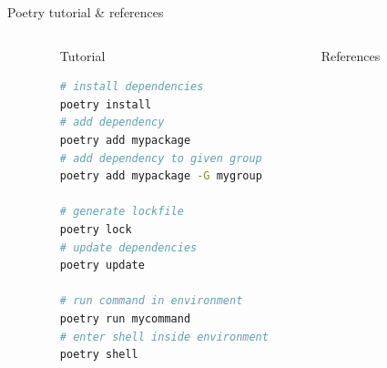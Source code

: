 \documentclass[9pt]{beamer}
\begin{document}
\begin{frame}[fragile]{Poetry tutorial \& references}
    \begin{columns}
        \begin{column}{0.1\textwidth}
        \end{column}
        \begin{column}{0.4\textwidth}
            Tutorial
            \begin{lstlisting}[language=bash,style=mystyle]
# install dependencies
poetry install
# add dependency
poetry add mypackage
# add dependency to given group
poetry add mypackage -G mygroup

# generate lockfile
poetry lock
# update dependencies
poetry update

# run command in environment
poetry run mycommand
# enter shell inside environment
poetry shell\end{lstlisting}
        \end{column}
        \begin{column}{0.4\textwidth}
            References
            \lipsum[1]
        \end{column}
        \begin{column}{0.1\textwidth}
        \end{column}
    \end{columns}
\end{frame}
\end{document}
